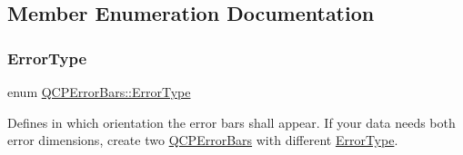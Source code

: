 \subsection{Member Enumeration Documentation}
\mbox{\label{class_q_c_p_error_bars_a95f0220f11a72648b96480a85ce26474}} 
\subsubsection{\texorpdfstring{Error\+Type}{ErrorType}\hspace{0.1cm}{\footnotesize\ttfamily [1/2]}}
{\footnotesize\ttfamily enum \hyperlink{class_q_c_p_error_bars_a95f0220f11a72648b96480a85ce26474}{Q\+C\+P\+Error\+Bars\+::\+Error\+Type}}

Defines in which orientation the error bars shall appear. If your data needs both error dimensions, create two \hyperlink{class_q_c_p_error_bars}{Q\+C\+P\+Error\+Bars} with different \hyperlink{class_q_c_p_error_bars_a95f0220f11a72648b96480a85ce26474}{Error\+Type}.

